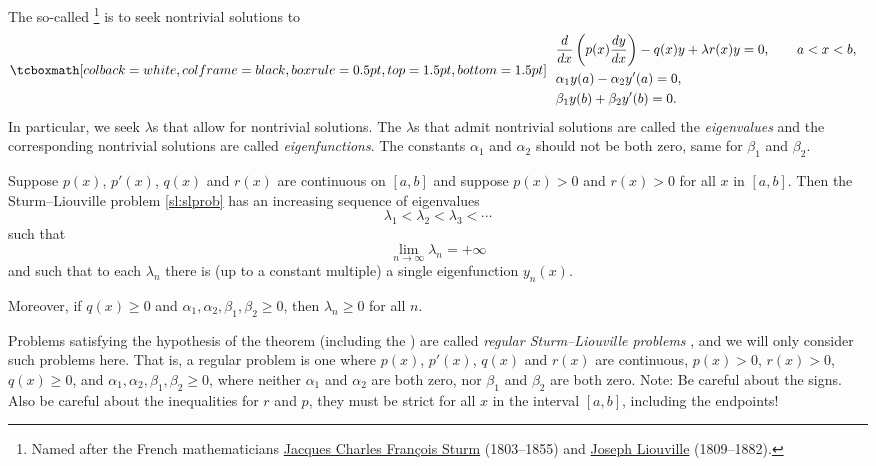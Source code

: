 The so-called 
\emph{}%
\footnote{Named after the French mathematicians
\href{https://en.wikipedia.org/wiki/Jacques_Charles_Fran\%C3\%A7ois_Sturm}{Jacques Charles Fran\c{c}ois Sturm}
(1803--1855) and
\href{https://en.wikipedia.org/wiki/Liouville}{Joseph Liouville}
(1809--1882).} is to seek
nontrivial solutions to
\begin{equation} \label{sl:slprob}
\mybxbg{~~
\begin{aligned}
&\frac{d}{dx} \left( p(x) \frac{dy}{dx} \right)
- q(x) y + \lambda r(x) y = 0, \qquad a < x < b, \\
&\alpha_1 y(a) - \alpha_2 y'(a) = 0, \\
&\beta_1 y(b) + \beta_2 y'(b) = 0.
\end{aligned}
~~}
\end{equation}
In particular, we seek $\lambda$s that allow for nontrivial solutions.
The $\lambda$s that admit nontrivial solutions
are called the \emph{eigenvalues}
and the corresponding
nontrivial solutions are called
\emph{eigenfunctions}.
The constants $\alpha_1$ and $\alpha_2$ should not be both zero, same for
$\beta_1$ and $\beta_2$.

\begin{theorem} \label{sl:slregthm}
Suppose $p(x)$, $p'(x)$, $q(x)$ and $r(x)$ are continuous on $[a,b]$
and suppose $p(x) > 0$ and $r(x) > 0$ for all $x$ in $[a,b]$.
Then the Sturm--Liouville problem \eqref{sl:slprob}
has an increasing sequence of eigenvalues
\begin{equation*}
\lambda_1 < \lambda_2 < \lambda_3 < \cdots 
\end{equation*}
such that
\begin{equation*}
\lim_{n \to \infty} \lambda_n = +\infty
\end{equation*}
and such that to each $\lambda_n$ there is (up to a constant multiple)
a single eigenfunction $y_n(x)$. 

Moreover, if $q(x) \geq 0$ and $\alpha_1, \alpha_2, \beta_1, \beta_2 \geq 0$,
then $\lambda_n \geq 0$ for all $n$.
\end{theorem}

Problems satisfying the hypothesis of the theorem
(including the )
are called
\emph{regular Sturm--Liouville problems}%
,
and we will only consider such problems here.
That is, a regular problem is one where
$p(x)$, $p'(x)$, $q(x)$ and $r(x)$ are continuous, $p(x) > 0$, $r(x) > 0$,
$q(x) \geq 0$, and $\alpha_1, \alpha_2, \beta_1, \beta_2 \geq 0$,
where neither $\alpha_1$ and $\alpha_2$ are both zero,
nor
$\beta_1$ and $\beta_2$ are both zero.
Note: Be careful about the signs.  Also be careful about the inequalities
for $r$ and $p$, they
must be strict for all $x$ in the interval $[a,b]$, including the endpoints!

